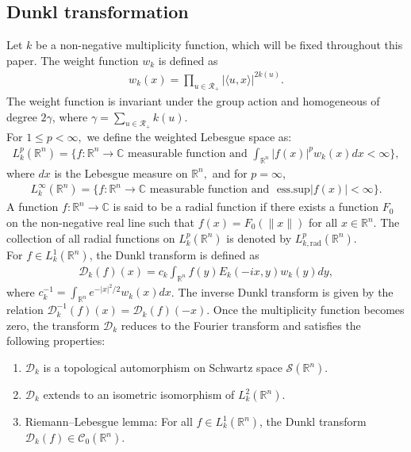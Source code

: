 \documentclass[11pt,a4paper,reqno]{amsproc}
\theoremstyle{definition}
\theoremstyle{remark}
\numberwithin{equation}{section}
\begin{document}
\subsection{Dunkl transformation}
Let $k$ be a non-negative multiplicity function, which will be fixed throughout this paper. The weight function $w_k$ is defined as
\begin{align*}
    w_k(x) = \prod_{u\in \mathcal{R}_+}|\langle u,x\rangle|^{2k(u)}.
\end{align*}
The weight function is invariant under the group action and homogeneous of degree $2\gamma$, where  $\gamma  = \sum_{u\in \mathcal{R}_+} k(u)$.\\
For $1\leq p <\infty,$ we define the weighted Lebesgue space  as:
\begin{align*}
    L_k^p(\mathbb{R}^n) = \{ f:\mathbb{R}^n \longrightarrow \mathbb{C} \text{ measurable function and } \int_{\mathbb{R}^n}|f(x)|^pw_k(x)dx< \infty
    \},
\end{align*} where $dx$ is the Lebesgue measure on $\mathbb{R}^n,$ and for $p=\infty$,
\begin{align*}
    L^{\infty}_k(\mathbb{R}^n) = \{ f:\mathbb{R}^n \longrightarrow \mathbb{C} \text{ measurable function and } \text{ ess.sup}|f(x)| < \infty \}.
\end{align*}
A function $f:\mathbb{R}^n \longrightarrow \mathbb{C}$ is said to be a radial function if there exists a function $F_0$ on the non-negative real line such that $f(x)=F_0(\|x\|)$ for all $x \in \mathbb{R}^n.$ The collection of all radial functions on $L_{k}^p(\mathbb{R}^n)$ is denoted by $L_{k,\text{rad}}^p(\mathbb{R}^n)$.\\
For  $ f \in L_k^1(\mathbb{R}^n)$, the Dunkl transform \cite{DJ1,D3} is defined as
\begin{align*}
    \mathcal{D}_k(f)(x) =  c_k \int_{\mathbb{R}^n}f(y)E_k(-ix,y)w_k(y)dy,
\end{align*}
where $ c_k ^{-1} = \int_{\mathbb{R}^n} e^{-{|x|^2}/{2}}w_k(x)dx$. The inverse Dunkl transform is given by the relation $\mathcal{D}_k^{-1}(f)(x)=\mathcal{D}_k(f)(-x)$. Once the multiplicity function becomes zero, the transform $\mathcal{D}_k$  reduces to the Fourier transform and satisfies the following properties: 
\begin{enumerate}[$(i)$]
    \item $\mathcal{D}_k$ is a topological automorphism on Schwartz space $\mathcal{S}(\mathbb{R}^n)$.
    \item $\mathcal{D}_k$ extends to an isometric isomorphism of $L_k^2(\mathbb{R}^n)$.
    \item Riemann–Lebesgue lemma: For all $f\in L_k^1(\mathbb{R}^n)$, the Dunkl transform $\mathcal{D}_k(f) \in \mathcal{C}_0(\mathbb{R}^n)$.
\end{enumerate}
\end{document}
